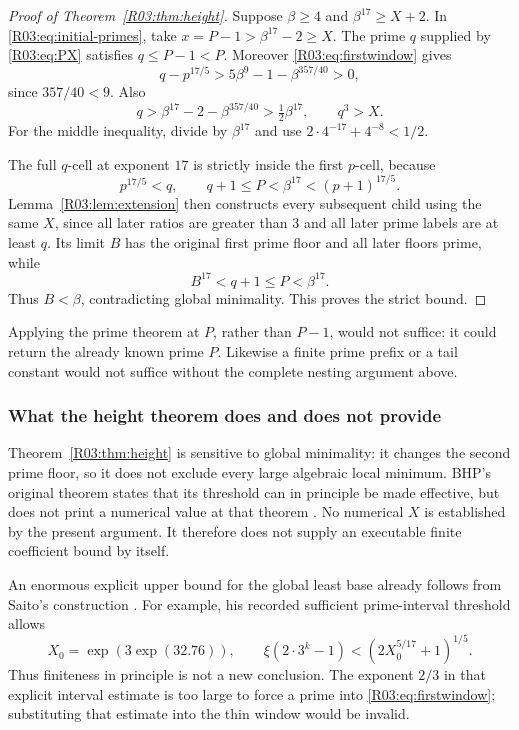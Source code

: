 \documentclass[11pt,a4paper]{article}
\theoremstyle{definition}\newtheorem{definition}[theorem]{Definition}
\theoremstyle{remark}\newtheorem{remark}[theorem]{Remark}
\begin{document}
\begin{proof}[Proof of Theorem~\ref{R03:thm:height}]
Suppose $\beta\ge4$ and $\beta^{17}\ge X+2$. In
\eqref{R03:eq:initial-primes}, take $x=P-1>\beta^{17}-2\ge X$.
The prime $q$ supplied by \eqref{R03:eq:PX} satisfies $q\le P-1<P$.
Moreover \eqref{R03:eq:firstwindow} gives
\[
 q-p^{17/5}>5\beta^9-1-\beta^{357/40}>0,
\]
since $357/40<9$. Also
\[
 q>\beta^{17}-2-\beta^{357/40}>\tfrac12\beta^{17},
 \qquad q^3>X.
\]
For the middle inequality, divide by $\beta^{17}$ and use
$2\cdot4^{-17}+4^{-8}<1/2$.

The full $q$-cell at exponent $17$ is strictly inside the first
$p$-cell, because
\[
 p^{17/5}<q,\qquad q+1\le P<\beta^{17}<(p+1)^{17/5}.
\]
Lemma~\ref{R03:lem:extension} then constructs every subsequent child
using the same $X$, since all later ratios are greater than $3$ and
all later prime labels are at least $q$. Its limit $B$ has the
original first prime floor and all later floors prime, while
\[
 B^{17}<q+1\le P<\beta^{17}.
\]
Thus $B<\beta$, contradicting global minimality. This proves the
strict bound.
\end{proof}

Applying the prime theorem at $P$, rather than $P-1$, would not
suffice: it could return the already known prime $P$. Likewise a
finite prime prefix or a tail constant would not suffice without
the complete nesting argument above.

\subsubsection{What the height theorem does and does not provide}

Theorem~\ref{R03:thm:height} is sensitive to global minimality: it
changes the second prime floor, so it does not exclude every
large algebraic local minimum. BHP's original theorem states that
its threshold can in principle be made effective, but does not
print a numerical value at that theorem \cite[p.~532]{BHP}.
No numerical $X$ is established by the present argument. It therefore
does not supply an executable finite coefficient bound by itself.

An enormous explicit upper bound for the global least base already
follows from Saito's construction \cite[Section~2.3 and
Lemma~9.1]{Saito}. For example, his recorded sufficient prime-interval
threshold allows
\[
 X_0=\exp(3\exp(32.76)),\qquad
 \xi(2\cdot3^k-1)<(2X_0^{5/17}+1)^{1/5}.
\]
Thus finiteness in principle is not a new conclusion. The exponent
$2/3$ in that explicit interval estimate is too large to force a
prime into \eqref{R03:eq:firstwindow}; substituting that estimate into
the thin window would be invalid.
\end{document}
